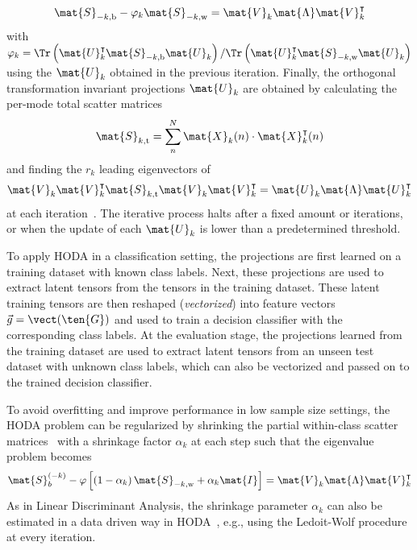 \begin{equation}
	\mat{S}_{-k,\text{b}}-\varphi_k\mat{S}_{-k,\text{w}} =
	\mat{V}_k\mat{\Lambda}\mat{V}_k^\intercal
\end{equation}
with $\varphi_k=\Tr\left(\mat{U}_k^\intercal\mat{S}_{-k,\text{b}}\mat{U}_k\right)/\Tr\left(\mat{U}_k^\intercal\mat{S}_{-k,\text{w}}\mat{U}_k\right)$
using the $\mat{U}_k$ obtained in the previous iteration.
Finally, the orthogonal transformation invariant projections $\mat{U}_k$
are obtained by calculating the
per-mode total scatter matrices
\begin{equation}
  \mat{S}_{k,\text{t}} = \sum_n^N\mat{X}_k(n)\cdot\mat{X}_k^\intercal(n)
\end{equation}
and finding the $r_k$ leading eigenvectors of
\begin{equation}
	\mat{V}_k\mat{V}_k^\intercal\mat{S}_{k,\text{t}}\mat{V}_k\mat{V}_k^\intercal
	= \mat{U}_k\mat{\Lambda}\mat{U}_k^\intercal
\end{equation}
at each iteration~\cite{Wang2007}.
The iterative process halts after a fixed amount or iterations, or when the
update of each $\mat{U}_k$ is lower than a predetermined threshold.

To apply HODA in a classification setting, the projections
are first learned on a training dataset  with known class labels.
Next, these projections are used to extract latent tensors from the
tensors in the training dataset.
These latent training tensors are then reshaped (\emph{vectorized}) into feature vectors
$\vec{g} =  \vect(\ten{G})$ and used to train a decision classifier with the corresponding class labels.
At the evaluation stage, the projections learned from the training dataset are
used to extract latent tensors from an unseen test dataset with unknown class
labels, which can also be vectorized and passed on to the trained decision
classifier.

To avoid overfitting and improve performance in low sample size settings, the
HODA problem can be regularized by shrinking the partial
within-class scatter matrices~\cite{Phan2010} with a shrinkage factor
$\alpha_k$ at each step such that the eigenvalue problem becomes
\begin{equation}
	\mat{S}_b^{(-k)} -
	\varphi\left[\left(1-\alpha_k\right)\mat{S}_{-k,\text{w}}+\alpha_k\mat{I}\right] =
	\mat{V}_k\mat{\Lambda}\mat{V}_k^\intercal
\end{equation}
As in Linear Discriminant Analysis, the shrinkage parameter $\alpha_k$ can
also be estimated in a data driven way in HODA~\cite{Jorajuria2022},
e.g., using the Ledoit-Wolf procedure~\cite{Ledoit2003} at every iteration.


